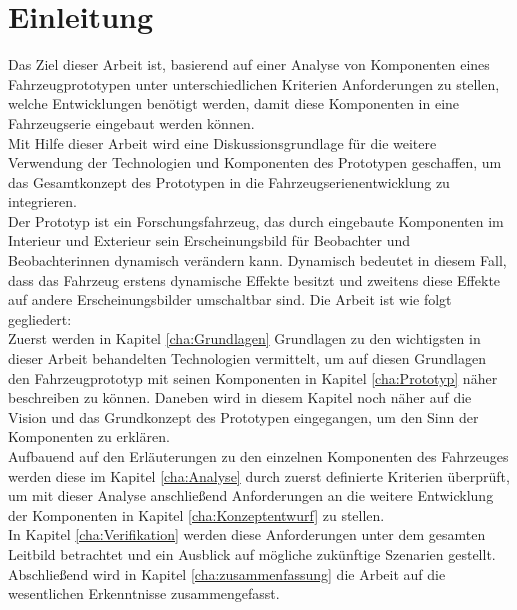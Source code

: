 \chapter{Einleitung}
\label{cha:Einleitung}
Das Ziel dieser Arbeit ist, basierend auf einer Analyse von Komponenten eines Fahrzeugprototypen unter unterschiedlichen Kriterien Anforderungen zu stellen, welche Entwicklungen benötigt werden, damit diese Komponenten in eine Fahrzeugserie eingebaut werden können.\\
Mit Hilfe dieser Arbeit wird eine Diskussionsgrundlage für die weitere Verwendung der Technologien und Komponenten des Prototypen geschaffen, um das Gesamtkonzept des Prototypen in die Fahrzeugserienentwicklung zu integrieren.\\
Der Prototyp ist ein Forschungsfahrzeug, das durch eingebaute Komponenten im Interieur und Exterieur sein Erscheinungsbild für Beobachter und Beobachterinnen dynamisch verändern kann. Dynamisch bedeutet in diesem Fall, dass das Fahrzeug erstens dynamische Effekte besitzt und zweitens diese Effekte auf andere Erscheinungsbilder umschaltbar sind.
Die Arbeit ist wie folgt gegliedert:\\
Zuerst werden in Kapitel \ref{cha:Grundlagen} Grundlagen zu den wichtigsten in dieser Arbeit behandelten Technologien vermittelt, um auf diesen Grundlagen den Fahrzeugprototyp mit seinen Komponenten in Kapitel \ref{cha:Prototyp} näher beschreiben zu können. Daneben wird in diesem Kapitel noch näher auf die Vision und das Grundkonzept des Prototypen eingegangen, um den Sinn der Komponenten zu erklären.\\
Aufbauend auf den Erläuterungen zu den einzelnen Komponenten des Fahrzeuges werden diese im Kapitel \ref{cha:Analyse} durch zuerst definierte Kriterien überprüft, um mit dieser Analyse anschließend Anforderungen an die weitere Entwicklung der Komponenten in Kapitel \ref{cha:Konzeptentwurf} zu stellen.\\
In Kapitel \ref{cha:Verifikation} werden diese Anforderungen unter dem gesamten Leitbild betrachtet und ein Ausblick auf mögliche zukünftige Szenarien gestellt. Abschließend wird in Kapitel \ref{cha:zusammenfassung} die Arbeit auf die wesentlichen Erkenntnisse zusammengefasst.